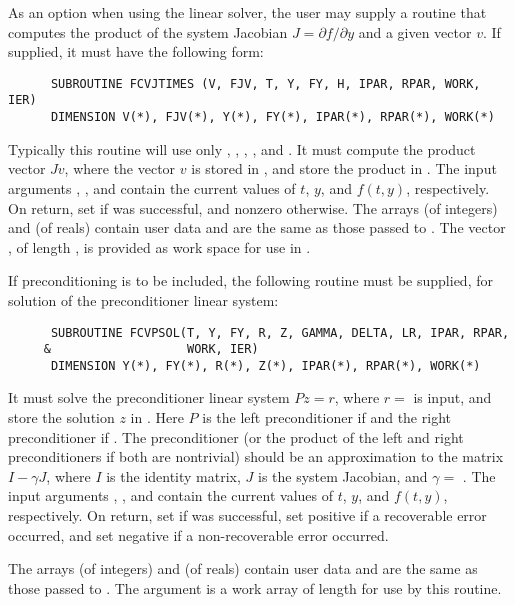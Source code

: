 \begin{Steps}
  As an option when using the {\spgmr} linear solver, the user may supply a 
  routine that computes the product of the system Jacobian 
  $J = \partial f / \partial y$ 
  and a given vector $v$.  If supplied, it must have the following form:
\begin{verbatim}
      SUBROUTINE FCVJTIMES (V, FJV, T, Y, FY, H, IPAR, RPAR, WORK, IER)
      DIMENSION V(*), FJV(*), Y(*), FY(*), IPAR(*), RPAR(*), WORK(*)
\end{verbatim}
  Typically this routine will use only , , , , and
  .  It must compute the product vector $Jv$, where the vector $v$ is
  stored in , and store the product in .  
  The input arguments , , and  contain the current
  values of $t$, $y$, and $f(t,y)$, respectively.  On return, set
   if  was successful, and nonzero otherwise.
  The arrays  (of integers) and  (of reals) contain user data
  and are the same as those passed to .
  The vector , of length , is
  provided as work space for use in .

  If preconditioning is to be included, the following routine must be
  supplied, for solution of the preconditioner linear system:
\begin{verbatim}
      SUBROUTINE FCVPSOL(T, Y, FY, R, Z, GAMMA, DELTA, LR, IPAR, RPAR,
     &                   WORK, IER)
      DIMENSION Y(*), FY(*), R(*), Z(*), IPAR(*), RPAR(*), WORK(*)
\end{verbatim}
  It must solve the preconditioner linear system $Pz = r$, where $r =$  
  is input, and store the solution $z$ in . Here $P$ is the left 
  preconditioner if  and the right preconditioner if .  
  The preconditioner (or the product of the left and right preconditioners 
  if both are nontrivial) should be an  approximation to the matrix 
  $I - \gamma J$, where $I$ is the identity matrix, $J$ is the system Jacobian,
  and $\gamma =$ .
  The input arguments , , and  contain the current
  values of $t$, $y$, and $f(t,y)$, respectively.
  On return, set  if  was successful, set 
  positive if a recoverable error occurred, and set  negative if a 
  non-recoverable error occurred.

  The arrays  (of integers) and  (of reals) contain user data
  and are the same as those passed to .
  The argument  is a work array of length  for use by this
  routine.


\end{Steps}
